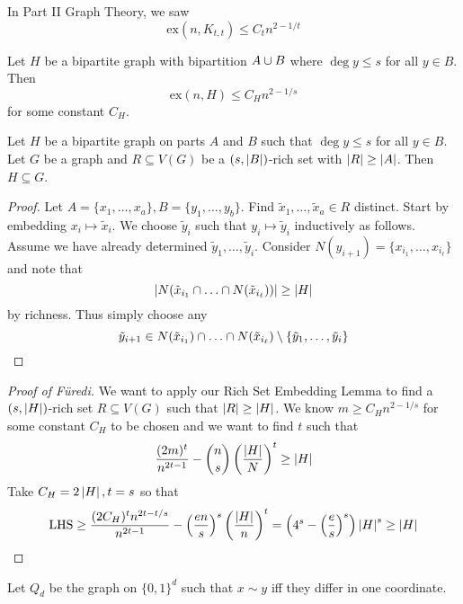 \documentclass{article}
\begin{document}
In Part II Graph Theory, we saw
$$\mathrm{ex}(n, K_{t, t}) \le C_t n^{2 - 1/t}$$

\begin{thm}[Füredi, 1991]
  Let $H$ be a bipartite graph with bipartition $A \cup B$ where $\deg y \le s$ for all $y \in B$. Then
  $$\mathrm{ex}(n, H) \le C_H n^{2 - 1/s}$$
  for some constant $C_H$.
\end{thm}

\newlec

\begin{lem}
  Let $H$ be a bipartite graph on parts $A$ and $B$ such that $\deg y \le s$ for all $y \in B$. Let $G$ be a graph and $R \subseteq V(G)$ be a $(s, \left\lvert B\right\rvert)$-rich set with $\left\lvert R\right\rvert \ge \left\lvert A\right\rvert$. Then $H \subseteq G$.
\end{lem}
\begin{proof}
  Let $A = \{x_1, \dots, x_a\}, B = \{y_1, \dots, y_b\}$. Find $\tilde x_1, \dots, \tilde x_a \in R$ distinct. Start by embedding $x_i \mapsto \tilde x_i$. We choose $\tilde y_i$ such that $y_i \mapsto \tilde y_i$ inductively as follows. Assume we have already determined $\tilde y_1, \dots, \tilde y_i$. Consider $N(y_{i + 1}) = \{x_{i_1}, \dots, x_{i_\ell}\}$ and note that
  $$\abs{N(\tilde x_{i_1} \inter \dots \inter N(\tilde x_{i_\ell}))} \ge \abs H$$
  by richness. Thus simply choose any
  $$\tilde y_{i + 1} \in N(\tilde x_{i_1}) \inter \dots \inter N(\tilde x_{i_\ell}) \setminus \{\tilde y_1, \dots, \tilde y_i\}$$
\end{proof}

\begin{proof}[Proof of Füredi]
  We want to apply our Rich Set Embedding Lemma to find a $(s, \left\lvert H\right\rvert)$-rich set $R \subseteq V(G)$ such that $\left\lvert R\right\rvert \ge \left\lvert H\right\rvert$. We know $m \ge C_H n^{2 - 1/s}$ for some constant $C_H$ to be chosen and we want to find $t$ such that
  $$\frac{(2m)^t}{n^{2t - 1}} - \binom ns \left(\frac{\left\lvert H\right\rvert}N\right)^t \ge \left\lvert H\right\rvert$$
  Take $C_H = 2\left\lvert H\right\rvert, t = s$ so that
  $$\operatorname{LHS} \ge \frac{(2C_H)^t n^{2t - t/s}}{n^{2t - 1}} - \left(\frac{en}s\right)^s \left(\frac{\left\lvert H\right\rvert}n\right)^t = \left(4^s - \left(\frac es\right)^s\right)\left\lvert H\right\rvert^s \ge \left\lvert H\right\rvert$$
\end{proof}

Let $Q_d$ be the graph on $\{0, 1\}^d$ such that $x \sim y$ iff they differ in one coordinate.
\end{document}
